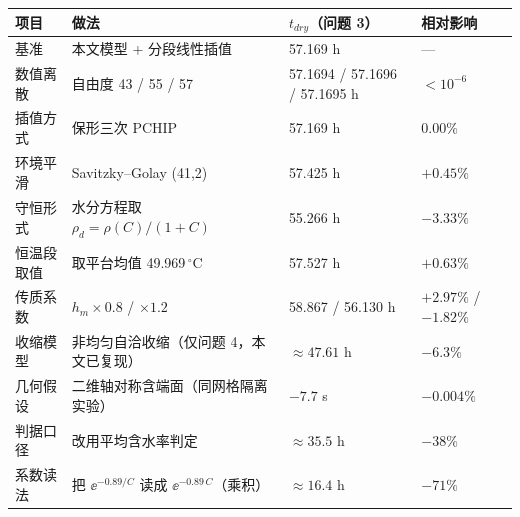 \begin{tabular}{@{}llll@{}}
\toprule
项目 & 做法 & $t_{dry}$（问题 3） & 相对影响 \\
\midrule
基准 & 本文模型 + 分段线性插值 & 57.169 h & --- \\
数值离散 & 自由度 43 / 55 / 57 & 57.1694 / 57.1696 / 57.1695 h & $<10^{-6}$ \\
插值方式 & 保形三次 PCHIP & 57.169 h & $0.00\%$ \\
环境平滑 & Savitzky--Golay (41,2) & 57.425 h & $+0.45\%$ \\
守恒形式 & 水分方程取 $\rho_d=\rho(C)/(1+C)$ & 55.266 h & $-3.33\%$ \\
恒温段取值 & 取平台均值 49.969$\,^\circ$C & 57.527 h & $+0.63\%$ \\
传质系数 & $h_m\times0.8$ / $\times1.2$ & 58.867 / 56.130 h & $+2.97\%$ / $-1.82\%$ \\
收缩模型 & 非均匀自洽收缩（仅问题 4，本文已复现） & $\approx47.61$ h & $-6.3\%$ \\
几何假设 & 二维轴对称含端面（同网格隔离实验） & $-7.7$ s & $-0.004\%$ \\
判据口径 & 改用平均含水率判定 & $\approx35.5$ h & $-38\%$ \\
系数读法 & 把 $\ee^{-0.89/C}$ 读成 $\ee^{-0.89\,C}$（乘积） & $\approx16.4$ h & $-71\%$ \\
\bottomrule
\end{tabular}
